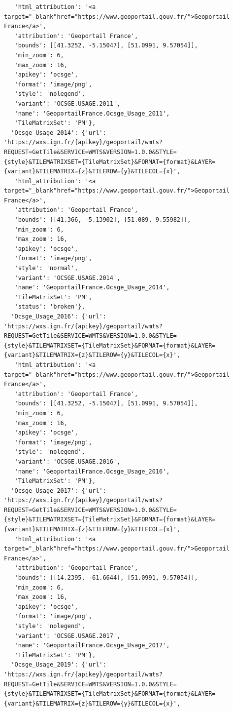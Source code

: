 \documentclass[
  letterpaper,
  DIV=11,
  numbers=noendperiod]{scrreprt}
\begin{document}
\begin{verbatim}
   'html_attribution': '<a target="_blank"href="https://www.geoportail.gouv.fr/">Geoportail France</a>',
   'attribution': 'Geoportail France',
   'bounds': [[41.3252, -5.15047], [51.0991, 9.57054]],
   'min_zoom': 6,
   'max_zoom': 16,
   'apikey': 'ocsge',
   'format': 'image/png',
   'style': 'nolegend',
   'variant': 'OCSGE.USAGE.2011',
   'name': 'GeoportailFrance.Ocsge_Usage_2011',
   'TileMatrixSet': 'PM'},
  'Ocsge_Usage_2014': {'url': 'https://wxs.ign.fr/{apikey}/geoportail/wmts?REQUEST=GetTile&SERVICE=WMTS&VERSION=1.0.0&STYLE={style}&TILEMATRIXSET={TileMatrixSet}&FORMAT={format}&LAYER={variant}&TILEMATRIX={z}&TILEROW={y}&TILECOL={x}',
   'html_attribution': '<a target="_blank"href="https://www.geoportail.gouv.fr/">Geoportail France</a>',
   'attribution': 'Geoportail France',
   'bounds': [[41.366, -5.13902], [51.089, 9.55982]],
   'min_zoom': 6,
   'max_zoom': 16,
   'apikey': 'ocsge',
   'format': 'image/png',
   'style': 'normal',
   'variant': 'OCSGE.USAGE.2014',
   'name': 'GeoportailFrance.Ocsge_Usage_2014',
   'TileMatrixSet': 'PM',
   'status': 'broken'},
  'Ocsge_Usage_2016': {'url': 'https://wxs.ign.fr/{apikey}/geoportail/wmts?REQUEST=GetTile&SERVICE=WMTS&VERSION=1.0.0&STYLE={style}&TILEMATRIXSET={TileMatrixSet}&FORMAT={format}&LAYER={variant}&TILEMATRIX={z}&TILEROW={y}&TILECOL={x}',
   'html_attribution': '<a target="_blank"href="https://www.geoportail.gouv.fr/">Geoportail France</a>',
   'attribution': 'Geoportail France',
   'bounds': [[41.3252, -5.15047], [51.0991, 9.57054]],
   'min_zoom': 6,
   'max_zoom': 16,
   'apikey': 'ocsge',
   'format': 'image/png',
   'style': 'nolegend',
   'variant': 'OCSGE.USAGE.2016',
   'name': 'GeoportailFrance.Ocsge_Usage_2016',
   'TileMatrixSet': 'PM'},
  'Ocsge_Usage_2017': {'url': 'https://wxs.ign.fr/{apikey}/geoportail/wmts?REQUEST=GetTile&SERVICE=WMTS&VERSION=1.0.0&STYLE={style}&TILEMATRIXSET={TileMatrixSet}&FORMAT={format}&LAYER={variant}&TILEMATRIX={z}&TILEROW={y}&TILECOL={x}',
   'html_attribution': '<a target="_blank"href="https://www.geoportail.gouv.fr/">Geoportail France</a>',
   'attribution': 'Geoportail France',
   'bounds': [[14.2395, -61.6644], [51.0991, 9.57054]],
   'min_zoom': 6,
   'max_zoom': 16,
   'apikey': 'ocsge',
   'format': 'image/png',
   'style': 'nolegend',
   'variant': 'OCSGE.USAGE.2017',
   'name': 'GeoportailFrance.Ocsge_Usage_2017',
   'TileMatrixSet': 'PM'},
  'Ocsge_Usage_2019': {'url': 'https://wxs.ign.fr/{apikey}/geoportail/wmts?REQUEST=GetTile&SERVICE=WMTS&VERSION=1.0.0&STYLE={style}&TILEMATRIXSET={TileMatrixSet}&FORMAT={format}&LAYER={variant}&TILEMATRIX={z}&TILEROW={y}&TILECOL={x}',

\end{verbatim}
\end{document}

